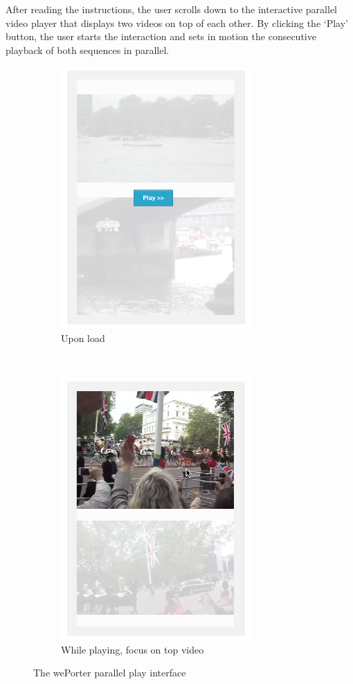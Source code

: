 After reading the instructions, the user scrolls down to the interactive parallel video player that displays two videos on top of each other. By clicking the `Play' button, the user starts the interaction and sets in motion the consecutive playback of both sequences in parallel.

\begin{figure}
  \centering
  \begin{subfigure}[b]{.5\textwidth}
          \centering
          \includegraphics[height=10cm]{img/pplay1}
          \vfil
          \caption{Upon load}
          \label{fig:pplay1}
  \end{subfigure}%
  ~
  \begin{subfigure}[b]{.5\textwidth}
          \centering
          \includegraphics[height=10cm]{img/pplay2_cursor}
          \vfil
          \caption{While playing, focus on top video}
          \label{fig:pplay2}
  \end{subfigure}
  \caption{The wePorter parallel play interface}\label{fig:interface}
\end{figure}


